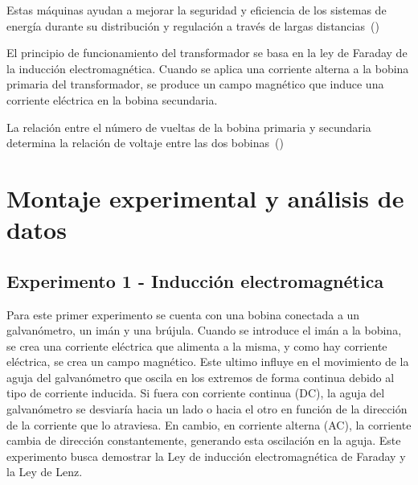 \documentclass[twocolumn, 12pt]{article}
\begin{document}
Estas máquinas ayudan a mejorar la seguridad y eficiencia
de los sistemas de energía durante su distribución y
regulación a través de largas
distancias~(\cite{tecsa_2021})

El principio de funcionamiento del transformador se basa en
la ley de Faraday de la inducción electromagnética. Cuando
se aplica una corriente alterna a la bobina primaria del
transformador, se produce un campo magnético que induce una
corriente eléctrica en la bobina secundaria.

La relación entre el número de vueltas de la bobina
primaria y secundaria determina la relación de voltaje
entre las dos bobinas~(\cite{rodriguez_2014})

\section{Montaje experimental y análisis de datos}

\subsection*{Experimento 1 - Inducción electromagnética}

Para este primer experimento se cuenta con una bobina
conectada a un galvanómetro, un imán y una brújula. Cuando
se introduce el imán a la bobina, se crea una corriente
eléctrica que alimenta a la misma, y como hay corriente
eléctrica, se crea un campo magnético. Este ultimo influye
en el movimiento de la aguja del galvanómetro que oscila en
los extremos de forma continua debido al tipo de corriente
inducida. Si fuera con corriente continua (DC), la aguja
del galvanómetro se desviaría hacia un lado o hacia el otro
en función de la dirección de la corriente que lo
atraviesa. En cambio, en corriente alterna (AC), la
corriente cambia de dirección constantemente, generando
esta oscilación en la aguja. Este experimento busca
demostrar la Ley de inducción electromagnética de Faraday y
la Ley de Lenz.
\end{document}
